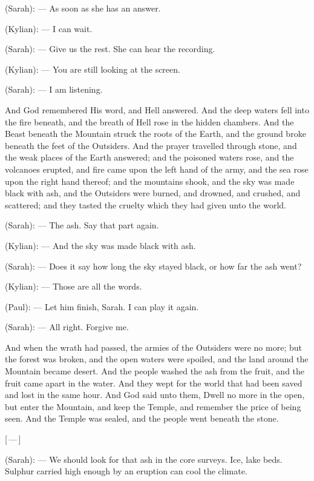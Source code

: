 \begin{room}
(Sarah): --- As soon as she has an answer.

(Kylian): --- I can wait.

(Sarah): --- Give us the rest. She can hear the recording.

(Kylian): --- You are still looking at the screen.

(Sarah): --- I am listening.

\begin{scripture}
And God remembered His word, and Hell answered. And the deep waters fell into the fire beneath, and the breath of Hell rose in the hidden chambers. And the Beast beneath the Mountain struck the roots of the Earth, and the ground broke beneath the feet of the Outsiders. And the prayer travelled through stone, and the weak places of the Earth answered; and the poisoned waters rose, and the volcanoes erupted, and fire came upon the left hand of the army, and the sea rose upon the right hand thereof; and the mountains shook, and the sky was made black with ash, and the Outsiders were burned, and drowned, and crushed, and scattered; and they tasted the cruelty which they had given unto the world.
\end{scripture}

(Sarah): --- The ash. Say that part again.

(Kylian): --- And the sky was made black with ash.

(Sarah): --- Does it say how long the sky stayed black, or how far the ash went?

(Kylian): --- Those are all the words.

(Paul): --- Let him finish, Sarah. I can play it again.

(Sarah): --- All right. Forgive me.

\begin{scripture}
And when the wrath had passed, the armies of the Outsiders were no more; but the forest was broken, and the open waters were spoiled, and the land around the Mountain became desert. And the people washed the ash from the fruit, and the fruit came apart in the water. And they wept for the world that had been saved and lost in the same hour. And God said unto them, Dwell no more in the open, but enter the Mountain, and keep the Temple, and remember the price of being seen. And the Temple was sealed, and the people went beneath the stone.
\end{scripture}

\centerline{[\,---\,]}

(Sarah): --- We should look for that ash in the core surveys. Ice, lake beds. Sulphur carried high enough by an eruption can cool the climate.


\end{room}

